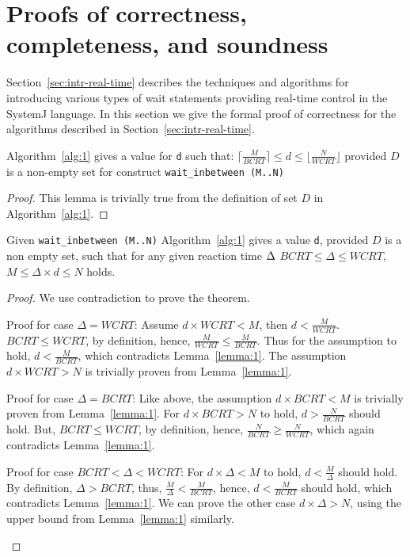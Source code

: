 \section{Proofs of correctness, completeness, and soundness}
\label{sec:proof-correctness}

Section~\ref{sec:intr-real-time} describes the techniques and algorithms
for introducing various types of wait statements providing real-time
control in the SystemJ language. In this section we give the formal
proof of correctness for the algorithms described in
Section~\ref{sec:intr-real-time}.

\begin{lemma}
  Algorithm~\ref{alg:1} gives a value for \texttt{d} such that: $\lceil
  \frac{M}{BCRT} \rceil \leq d \leq \lfloor \frac{N}{WCRT} \rfloor$
  provided $D$ is a non-empty set for construct \texttt{wait\_inbetween
    (M..N)}
\label{lemma:1}
\end{lemma}
\begin{proof}
  This lemma is trivially true from the definition of set $D$ in
  Algorithm~\ref{alg:1}.
\end{proof}

\begin{theorem}
  Given \texttt{wait\_inbetween (M..N)} Algorithm~\ref{alg:1} gives a
  value \texttt{d}, provided $D$ is a non empty set, such that for any
  given reaction time $\textcolor{black}{\Delta}$  $BCRT \leq
  \Delta \leq WCRT$, $M \leq \Delta \times d \leq N$ holds.
\label{th:1}
\end{theorem}
\begin{proof}
  We use contradiction to prove the theorem.
  \begin{compactenum}[\hspace{0.25cm} 1.]
  \item Proof for case $\Delta = WCRT$: Assume \mbox{$d \times WCRT <
      M$}, then $d < \frac{M}{WCRT}$. $BCRT \leq WCRT$, by definition,
    hence, $\frac{M}{WCRT} \leq \frac{M}{BCRT}$. Thus for the assumption
    to hold, $d < \frac{M}{BCRT}$, which contradicts
    Lemma~\ref{lemma:1}. The assumption $d \times WCRT >N$ is trivially
    proven from Lemma~\ref{lemma:1}.
  \item Proof for case $\Delta = BCRT$: Like above, the assumption $d
    \times BCRT < M$ is trivially proven from Lemma~\ref{lemma:1}. For
    $d \times BCRT > N$ to hold, $d > \frac{N}{BCRT}$ should hold. But,
    $BCRT \leq WCRT$, by definition, hence, $\frac{N}{BCRT} \geq
    \frac{N}{WCRT}$, which again contradicts Lemma~\ref{lemma:1}.
  \item Proof for case $BCRT < \Delta < WCRT$: For $d \times \Delta < M$
    to hold, $d < \frac{M}{\Delta}$ should hold. By definition, $\Delta
    > BCRT$, thus, $\frac{M}{\Delta} < \frac{M}{BCRT}$, hence, $d <
    \frac{M}{BCRT}$ should hold, which contradicts
    Lemma~\ref{lemma:1}. We can prove the other case $d \times \Delta >
    N$, using the upper bound from Lemma~\ref{lemma:1} similarly.
  \end{compactenum}
\end{proof}

